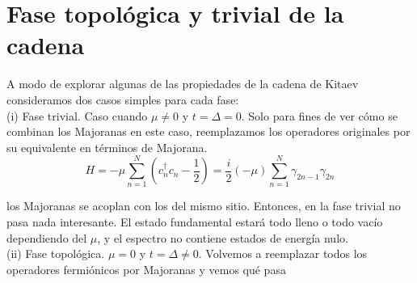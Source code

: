 \section{Fase topol\'{o}gica y trivial de la cadena}
A modo de explorar algunas de las propiedades de la cadena de Kitaev consideramos dos casos simples para cada fase:\\
(i) Fase trivial. Caso cuando $\mu\neq 0$ y $t=\Delta=0$. Solo para fines de ver c\'{o}mo se combinan los Majoranas en este caso, reemplazamos los operadores originales por su equivalente en t\'{e}rminos de Majorana.
    \begin{equation}
            H=-\mu\sum_{n=1}^N (c^\dagger_n c_n-\frac{1}{2})=\frac{i}{2}(-\mu) \sum_{n=1}^N \gamma_{2n-1}\gamma_{2n}
    \end{equation}
    \begin{center}
    \end{center}
    los Majoranas se acoplan con los del mismo sitio. Entonces, en la fase trivial no pasa nada interesante. El estado fundamental estar\'{a} todo lleno o todo vac\'{i}o dependiendo del $\mu$, y el espectro no contiene estados de energ\'{i}a nulo.\\
(ii) Fase topol\'{o}gica. $\mu=0$ y $t=\Delta\neq 0$. Volvemos a reemplazar todos los operadores fermi\'{o}nicos por Majoranas y vemos qu\'{e} pasa
